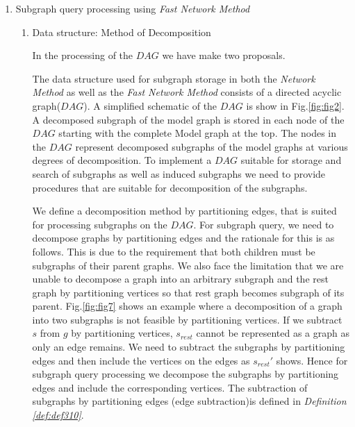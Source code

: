 \begin{enumerate}
\begin{enumerate}
\end{enumerate}

\item  Subgraph query processing using \textit{Fast Network Method}

\begin{enumerate}

\item Data structure: Method of Decomposition

In the processing of the $DAG$ we have make two proposals.



The data structure used for subgraph storage in both the \textit{Network Method} as well as the \textit{Fast Network Method} consists of a directed acyclic graph($DAG$). 
A simplified schematic of the $DAG$ is show in Fig.\ref{fig:fig2}.  
A decomposed subgraph of the model graph is stored in each node of the $DAG$ starting with the complete Model graph at the top.
The nodes in the $DAG$ represent decomposed subgraphs of the model graphs at various degrees of decomposition. 
To implement a $DAG$ suitable for storage and search of subgraphs as well as induced subgraphs we need to provide procedures that are suitable for decomposition of the subgraphs.



We define a decomposition method by partitioning edges, that is suited for processing subgraphs on the $DAG$.
For subgraph query, we need to decompose graphs by partitioning edges and the rationale for this is as follows. 
This is due to the requirement that both children must be subgraphs of their parent graphs.
We also face the limitation that we are unable to decompose a graph into an arbitrary subgraph and the rest graph by partitioning vertices so that rest graph becomes subgraph of its parent.
Fig.\ref{fig:fig7} shows an example where a decomposition of a graph into two subgraphs is not feasible by partitioning vertices.
If we subtract $s$ from $g$ by partitioning vertices, $s_{rest}$ cannot be represented as a graph as only an edge remains. 
We need to subtract the subgraphs by partitioning edges and then include the vertices on the edges as $s_{rest}'$ shows. 
Hence for subgraph query processing we decompose the subgraphs by partitioning edges and include the corresponding vertices.
The subtraction of subgraphs by partitioning edges (edge subtraction)is defined in \textit{Definition \ref{def:def310}}.



\end{enumerate}
\end{enumerate}
